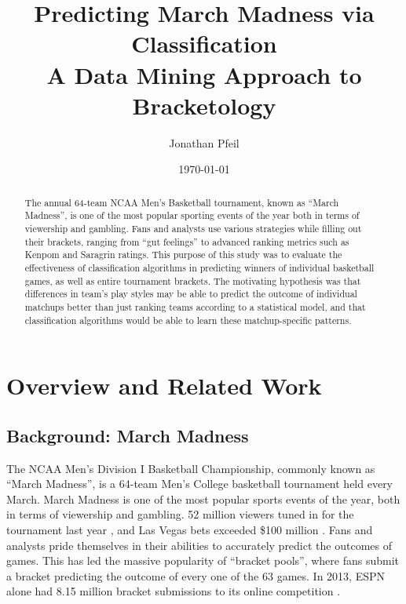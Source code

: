 \documentclass[]{article}
\begin{document}
\title{\textbf{Predicting March Madness via Classification } \\ {\Large A Data Mining Approach to Bracketology} }  
\author{Jonathan Pfeil}         
\date{\today}
\maketitle

\vspace{5mm}

\tableofcontents
\newpage

\begin{abstract}
The annual 64-team NCAA Men's Basketball tournament, known as ``March Madness'', is one of the most popular sporting events of the year both in terms of viewership and gambling. Fans and analysts use various strategies while filling out their brackets, ranging from ``gut feelings'' to advanced ranking metrics such as Kenpom and Saragrin ratings. This purpose of this study was to evaluate the effectiveness of classification algorithms in predicting winners of individual basketball games, as well as entire tournament brackets. The motivating hypothesis was that differences in team's play styles may be able to predict the outcome of individual matchups better than just ranking teams according to a statistical model, and that classification algorithms would be able to learn these matchup-specific patterns.
\end{abstract}

\section{Overview and Related Work}
\subsection{Background: March Madness}
The NCAA Men's Division I Basketball Championship, commonly known as ``March Madness'', is a 64-team Men's College basketball tournament held every March. March Madness is one of the most popular sports events of the year, both in terms of viewership and gambling. 52 million viewers tuned in for the tournament last year \cite{inoffice}, and Las Vegas bets exceeded \$100 million \cite{bettingonmadness}. Fans and analysts pride themselves in their abilities to accurately predict the outcomes of games. This has led the massive popularity of ``bracket pools'', where fans submit a bracket predicting the outcome of every one of the 63 games. In 2013, ESPN alone had 8.15 million bracket submissions to its online competition \cite{espnbracketnum}.
\end{document}
